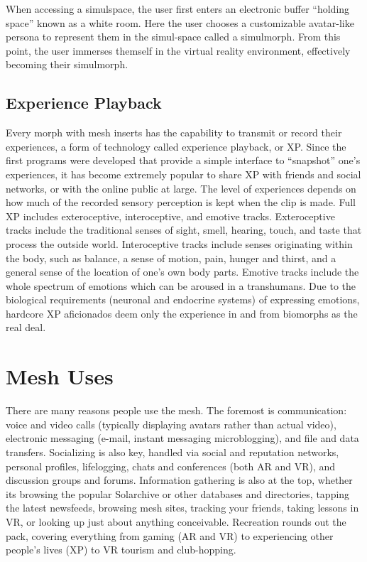 When accessing a simulspace, the user first enters an electronic buffer ``holding space'' known as a white room. Here the user chooses a customizable avatar-like persona to represent them in the simul-space called a simulmorph. From this point, the user immerses themself in the virtual reality environment, effectively becoming their simulmorph. 

\subsection{Experience Playback} 

Every morph with mesh inserts has the capability to transmit or record their experiences, a form of technology called experience playback, or XP. Since the first programs were developed that provide a simple interface to ``snapshot'' one's experiences, it has become extremely popular to share XP with friends and social networks, or with the online public at large. The level of experiences depends on how much of the recorded sensory perception is kept when the clip is made. Full XP includes exteroceptive, interoceptive, and emotive tracks. Exteroceptive tracks include the traditional senses of sight, smell, hearing, touch, and taste that process the outside world. Interoceptive tracks include senses originating within the body, such as balance, a sense of motion, pain, hunger and thirst, and a general sense of the location of one's own body parts. Emotive tracks include the whole spectrum of emotions which can be aroused in a transhumans. Due to the biological requirements (neuronal and endocrine systems) of expressing emotions, hardcore XP aficionados deem only the experience in and from biomorphs as the real deal. 

\section{Mesh Uses} 

There are many reasons people use the mesh. The foremost is communication: voice and video calls (typically displaying avatars rather than actual video), electronic messaging (e-mail, instant messaging microblogging), and file and data transfers. Socializing is also key, handled via social and reputation networks, personal profiles, lifelogging, chats and conferences (both AR and VR), and discussion groups and forums. Information gathering is also at the top, whether its browsing the popular Solarchive or other databases and directories, tapping the latest newsfeeds, browsing mesh sites, tracking your friends, taking lessons in VR, or looking up just about anything conceivable. Recreation rounds out the pack, covering everything from gaming (AR and VR) to experiencing other people's lives (XP) to VR tourism and club-hopping. 

